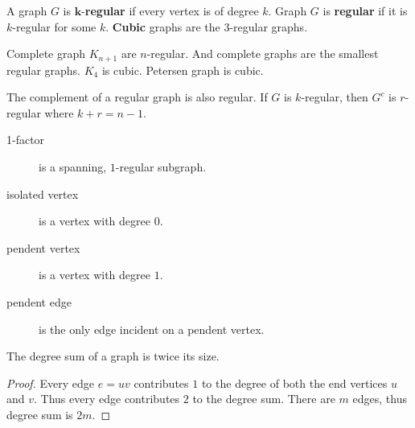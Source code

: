 \begin{definition}
	A graph $G$ is $\mathbf{k}$-\textbf{regular} if every vertex is of degree $k$. Graph $G$ is \textbf{regular} if it is $k$-regular for some $k$. \textbf{Cubic} graphs are the $3$-regular graphs.
\end{definition}
\begin{remark}
	Complete graph $K_{n+1}$ are $n$-regular.
	And complete graphs are the smallest regular graphs.
	$K_4$ is cubic.
	Petersen graph is cubic.
\end{remark}
\begin{figure}
\centering
{}
\end{figure}
\begin{remark}
	The complement of a regular graph is also regular. If $G$ is $k$-regular, then $G^c$ is $r$-regular where $k+r = n-1$.
\end{remark}
\begin{description}
	\item[1-factor] is a spanning, $1$-regular subgraph.
	\item[isolated vertex] is a vertex with degree $0$.
	\item[pendent vertex] is a vertex with degree $1$.
	\item[pendent edge] is the only edge incident on a pendent vertex.
\end{description}

\begin{theorem}[Euler]
	The degree sum of a graph is twice its size.
\end{theorem}
\begin{proof}
	Every edge $e= uv$ contributes $1$ to the degree of both the end vertices $u$ and $v$. Thus every edge contributes $2$ to the degree sum. There are $m$ edges, thus degree sum is $2m$.
\end{proof}

